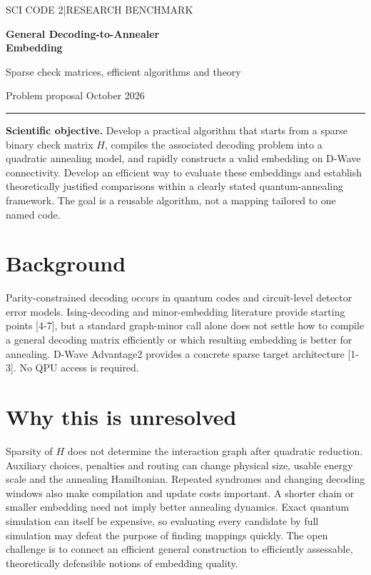 \documentclass[11pt,letterpaper]{article}
\begin{document}
\thispagestyle{plain}
{\color{accent}\small\sffamily SCI CODE 2\quad|\quad RESEARCH BENCHMARK}\par\vspace{8pt}
{\LARGE\bfseries General Decoding-to-Annealer\\[2pt] Embedding}\par\vspace{5pt}
{\large Sparse check matrices, efficient algorithms and theory}\par\vspace{5pt}
{\small Problem proposal\quad\textbullet{} October 2026}\par\vspace{7pt}
{\color{accent}\hrule}\vspace{10pt}

\textbf{Scientific objective.} Develop a practical algorithm that starts from a sparse binary check matrix $H$, compiles the associated decoding problem into a quadratic annealing model, and rapidly constructs a valid embedding on D-Wave connectivity. Develop an efficient way to evaluate these embeddings and establish theoretically justified comparisons within a clearly stated quantum-annealing framework. The goal is a reusable algorithm, not a mapping tailored to one named code.\par

\section{Background}

Parity-constrained decoding occurs in quantum codes and circuit-level detector error models. Ising-decoding and minor-embedding literature provide starting points [4-7], but a standard graph-minor call alone does not settle how to compile a general decoding matrix efficiently or which resulting embedding is better for annealing. D-Wave Advantage2 provides a concrete sparse target architecture [1-3]. No QPU access is required.\par

\section{Why this is unresolved}

Sparsity of $H$ does not determine the interaction graph after quadratic reduction. Auxiliary choices, penalties and routing can change physical size, usable energy scale and the annealing Hamiltonian. Repeated syndromes and changing decoding windows also make compilation and update costs important. A shorter chain or smaller embedding need not imply better annealing dynamics. Exact quantum simulation can itself be expensive, so evaluating every candidate by full simulation may defeat the purpose of finding mappings quickly. The open challenge is to connect an efficient general construction to efficiently assessable, theoretically defensible notions of embedding quality.\par
\end{document}
